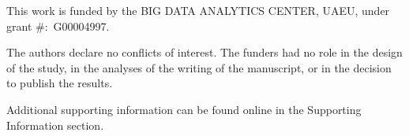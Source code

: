 \documentclass[ASNA,twocolumn]{USG} %
\begin{document}

This work is funded by the BIG DATA ANALYTICS CENTER, UAEU, under grant $\#:$ G00004997.


The authors declare no conflicts of interest. The funders had no role in the design of the study, in the analyses of the writing of the manuscript, or in the decision to publish the results.




Additional supporting information can be found online in the Supporting Information
section.






\nocite{*}%
\end{document}
